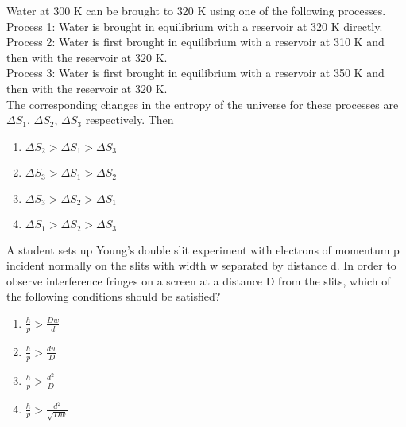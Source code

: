 \item Water at 300 K can be brought to 320 K using one of the following processes.\\
Process 1: Water is brought in equilibrium with a reservoir at 320 K directly.\\
Process 2: Water is first brought in equilibrium with a reservoir at 310 K and then with the reservoir at 320 K.\\
Process 3: Water is first brought in equilibrium with a reservoir at 350 K and then with the reservoir at 320 K.\\
The corresponding changes in the entropy of the universe for these processes are $\Delta S_1$, $\Delta S_2$, $\Delta S_3$ respectively. Then 
\begin{enumerate}
    \item $\Delta S_2 > \Delta S_1 > \Delta S_3$
    \item $\Delta S_3 > \Delta S_1 > \Delta S_2$
    \item $\Delta S_3 > \Delta S_2 > \Delta S_1$
    \item $\Delta S_1 > \Delta S_2 > \Delta S_3$
\end{enumerate}

\item A student sets up Young's double slit experiment with electrons of momentum p incident normally on the slits with width w separated by distance d. In order to observe interference fringes on a screen at a distance D from the slits, which of the following conditions should be satisfied?
\begin{enumerate}
    \item $\frac{h}{p} > \frac{Dw}{d}$
    \item $\frac{h}{p} > \frac{dw}{D}$
    \item $\frac{h}{p} > \frac{d^2}{D}$
    \item $\frac{h}{p} > \frac{d^2}{\sqrt{Dw}}$
\end{enumerate}

